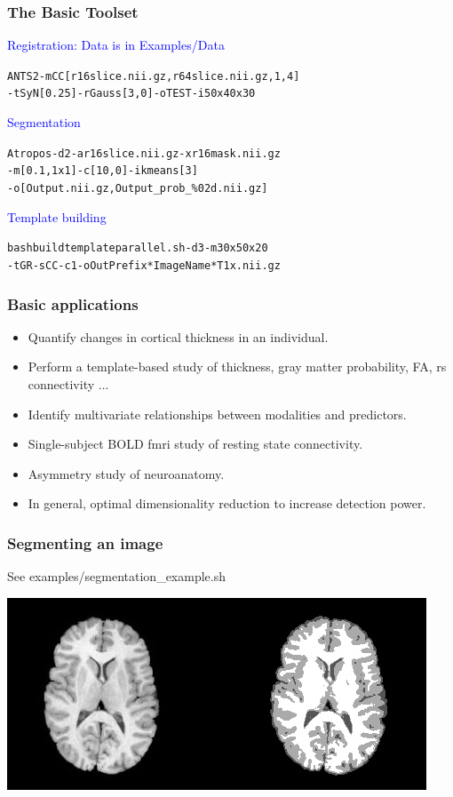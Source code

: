 \documentclass[18pt]{beamer}
\begin{document}
\begin{frame}
\frametitle{The Basic Toolset}
 \textcolor{blue}{Registration: Data is in Examples/Data} 
\begin{alltt}
ANTS 2 -m  CC[r16slice.nii.gz,r64slice.nii.gz,1,4] \newline
 -t SyN[0.25]  -r Gauss[3,0] -o TEST -i 50x40x30
\end{alltt}
\textcolor{blue}{Segmentation}
\begin{alltt}
Atropos -d 2 -a r16slice.nii.gz -x r16mask.nii.gz \newline
-m [0.1,1x1]   -c [10,0]  -i kmeans[3]\newline
-o [Output.nii.gz,Output\_prob\_\%02d.nii.gz]
\end{alltt}
\textcolor{blue}{Template building}
\begin{alltt}
 bash buildtemplateparallel.sh -d 3 -m 30x50x20 \newline 
-t GR  -s CC -c 1 -o OutPrefix  *ImageName*T1x.nii.gz
\end{alltt}
\end{frame}


\begin{frame}
\frametitle{Basic applications}
\begin{itemize}
\item Quantify changes in cortical thickness in an individual.
\pause 
\item Perform a template-based study of thickness, gray matter
  probability, FA, rs connectivity ... 
\pause
\item Identify multivariate relationships between modalities and
  predictors.
\pause
\item Single-subject BOLD fmri study of resting state connectivity.
\pause
\item Asymmetry study of neuroanatomy.
\pause
\item In general, optimal dimensionality reduction to increase detection power.  
\end{itemize}
\end{frame}



\begin{frame}
\frametitle{Segmenting an image}
See  examples/segmentation\_example.sh

\begin{center}
\includegraphics[width=3.in]{../figures/r64sliceseg.jpg}
\end{center}
\end{frame}
\end{document}
